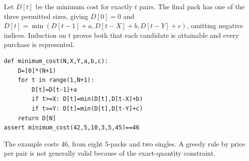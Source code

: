 Let $D[t]$ be the minimum cost for exactly $t$ pairs. The final pack has one of the three permitted sizes, giving $D[0]=0$ and $D[t]=\min(D[t-1]+a,D[t-X]+b,D[t-Y]+c)$, omitting negative indices. Induction on $t$ proves both that each candidate is attainable and every purchase is represented.\begin{verbatim}
def minimum_cost(N,X,Y,a,b,c):
    D=[0]*(N+1)
    for t in range(1,N+1):
        D[t]=D[t-1]+a
        if t>=X: D[t]=min(D[t],D[t-X]+b)
        if t>=Y: D[t]=min(D[t],D[t-Y]+c)
    return D[N]
assert minimum_cost(42,5,10,3,5,45)==46
\end{verbatim}
The example costs $\boxed{46}$, from eight 5-packs and two singles. A greedy rule by price per pair is not generally valid because of the exact-quantity constraint.
